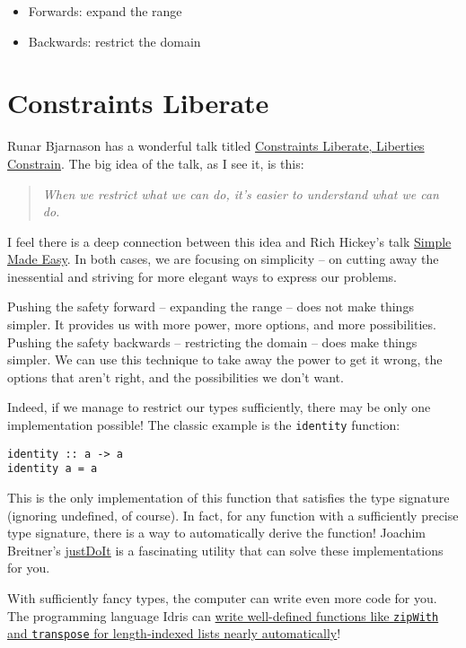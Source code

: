 \begin{itemize}
\item Forwards: expand the range
\item Backwards: restrict the domain
\end{itemize}




\section{Constraints Liberate}



Runar Bjarnason has a wonderful talk titled \href{https://www.youtube.com/watch?v=GqmsQeSzMdw}{Constraints Liberate, Liberties Constrain}. The big idea of the talk, as I see it, is this:
\begin{quotation}
\textit{When we restrict what we can do, it's easier to understand what we can do.}
\end{quotation}
I feel there is a deep connection between this idea and Rich Hickey's talk \href{https://www.youtube.com/watch?v=34_L7t7fD_U}{Simple Made Easy}. In both cases, we are focusing on simplicity -- on cutting away the inessential and striving for more elegant ways to express our problems.

Pushing the safety forward -- expanding the range -- does not make things simpler. It provides us with more power, more options, and more possibilities. Pushing the safety backwards -- restricting the domain -- does make things simpler. We can use this technique to take away the power to get it wrong, the options that aren't right, and the possibilities we don't want.

Indeed, if we manage to restrict our types sufficiently, there may be only one implementation possible! The classic example is the \texttt{identity} function:

\begin{verbatim}
identity :: a -> a
identity a = a
\end{verbatim}
This is the only implementation of this function that satisfies the type signature (ignoring undefined, of course). In fact, for any function with a sufficiently precise type signature, there is a way to automatically derive the function! Joachim Breitner's \href{https://www.joachim-breitner.de/blog/735-The_magic_%E2%80%9CJust_do_it%E2%80%9D_type_class}{justDoIt} is a fascinating utility that can solve these implementations for you.

With sufficiently fancy types, the computer can write even more code for you. The programming language Idris can \href{https://youtu.be/X36ye-1x_HQ?t=1140}{write well-defined functions like \texttt{zipWith} and \texttt{transpose} for length-indexed lists nearly automatically}!


